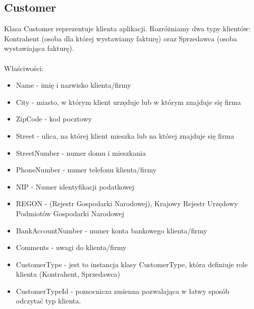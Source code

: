 \subsection{Customer}
Klasa Customer reprezentuje klienta aplikacji. Rozróżniamy dwa typy klientów: Kontrahent (osoba dla której wystawiamy fakturę) oraz Sprzedawca (osoba wystawiająca fakturę).
\\\\
Właściwości:
\begin{itemize}
    \item Name - imię i nazwisko klienta/firmy
    \item City - miasto, w którym klient urzęduje lub w którym znajduje się firma
    \item ZipCode - kod pocztowy
    \item Street - ulica, na której klient mieszka lub na której znajduje się firma
    \item StreetNumber - numer domu i mieszkania
    \item PhoneNumber - numer telefonu klienta/firmy
    \item NIP - Numer identyfikacji podatkowej
    \item REGON - (Rejestr Gospodarki Narodowej), Krajowy Rejestr Urzędowy Podmiotów Gospodarki Narodowej
    \item BankAccountNumber - numer konta bankowego klienta/firmy
    \item Comments - uwagi do klienta/firmy
    \item CustomerType - jest to instancja klasy CustomerType, która definiuje role klienta (Kontrahent, Sprzedawca)
    \item CustomerTypeId - pomocnicza zmienna pozwalająca w łatwy sposób odczytać typ klienta.
\end{itemize}

